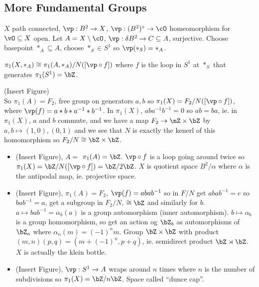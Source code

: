 
\subsection{More Fundamental Groups}

$X$ path connected, $\vp: B^2 \to X$, $\vp: (B^2)^{\circ} \to \cO$ homeomorphism for $\vO \subseteq X$ open. Let $A = X \setminus \cO$, $\vp: \delta B^2 \to C \subseteq A$, surjective. Choose basepoint $*_A \subseteq A$, choose $*_S \in S^1$ so $\vp(*_S) = *_A$. 

\begin{theorem}
    $\pi_1(X, *_A) \cong \pi_1(A, *_A)/N([\vp \circ f])$ where $f$ is the loop in $S^1$ at $*_S$ that generates $\pi_1(S^1) = \bZ$. 
\end{theorem}

(Insert Figure) \\

So $\pi_1(A) = F_2$, free group on generators $a,b$ so $\pi_1(X) = F_2/N([\vp \circ f])$, where $\vp(f) = a*b*a^{-1}*b^{-1}$. In $\pi_1(X)$, $aba^{-1}b^{-1}=0$ so $ab = ba$, ie. in $\pi_1(X)$, $a$ and $b$ commute, and we have a map $F_2 \to \nZ \times \bZ$ by $a, b \mapsto (1,0), (0,1)$ and we see that $N$ is exactly the kenerl of this homomorphism so $F_2/N \cong \bZ \times \bZ$. 

\begin{itemize}
    \item (Insert Figure), $A = $ $\pi_1(A) = \bZ$. $\vp \circ f$ is a loop going around twice so $\pi_1(X) = \bZ/N([\vp \circ f]) = \bZ/2\bZ$. $X$ is quotient space $B^2/\alpha$ where $\alpha$ is the antipodal map, ie. projective space. 
    \item (Insert Figure), $\pi_1(A) = F_2$, $\vp(f)=abab^{-1}$ so in $F/N$ get $abab^{-1}=e$ so $bab^{-1}=a$, get a subgroup in $F_2/N$, $\cong \bZ$ and similarly for $b$. \\
    $a \mapsto bab^{-1} = \alpha_b(a)$ is a group automorphism (inner automorphism). $b \mapsto \alpha_b$ is a group homomorphism, so get an action og $\bZ_b$ as automorphisms of $\bZ_a$ where $\alpha_n(m) = (-1)^nm$. Group $\bZ \times \bZ$ with product $(m,n)(p,q)=(m+(-1)^n, p+q)$, ie. semidirect product $\bZ \rtimes \bZ$. \\ 
    $X$ is actually the klein bottle. 
    \item (Insert Figure), $\vp: S^1 \to A$ wraps around $n$ times where $n$ is the number of subdivisions so $\pi_1(X) = \bZ/n\bZ$. Space called ``dunce cap''. 
\end{itemize}
